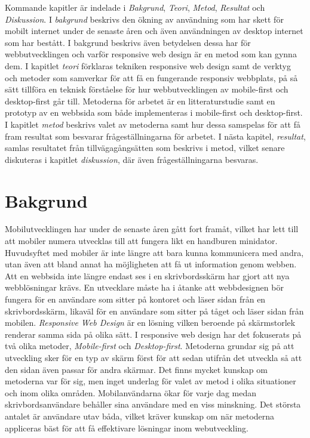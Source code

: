 \documentclass[11pt]{article}
\begin{document}
Kommande kapitler är indelade i \textit{Bakgrund}, \textit{Teori}, \textit{Metod}, \textit{Resultat} och \textit{Diskussion}. I \textit{bakgrund} beskrivs den ökning av användning som har skett för mobilt internet under de senaste åren och även användningen av desktop internet som har bestått. I bakgrund beskrivs även betydelsen dessa har för webbutvecklingen och varför responsive web design är en metod som kan gynna dem. I kapitlet \textit{teori} förklaras tekniken responsive web design samt de verktyg och metoder som samverkar för att få en fungerande responsiv webbplats, på så sätt tillföra en teknisk förståelse för hur webbutvecklingen av mobile-first och desktop-first går till. Metoderna för arbetet är en litteraturstudie samt en prototyp av en webbsida som både implementeras i mobile-first och desktop-first. I kapitlet \textit{metod} beskrivs valet av metoderna samt hur dessa samspelas för att få fram resultat som besvarar frågeställningarna för arbetet. I nästa kapitel, \textit{resultat}, samlas resultatet från tillvägagångsätten som beskrivs i metod, vilket senare diskuteras i kapitlet \textit{diskussion}, där även frågeställningarna besvaras. 



\newpage


\section{Bakgrund}

Mobilutvecklingen har under de senaste åren gått fort framåt, vilket har lett till att mobiler numera utvecklas till att fungera likt en handburen minidator. Huvudsyftet med mobiler är inte längre att bara kunna kommunicera med andra, utan även att bland annat ha möjligheten att få ut information genom webben. Att en webbsida inte längre endast ses i en skrivbordsskärm har gjort att nya webblösningar krävs. En utvecklare måste ha i åtanke att webbdesignen bör fungera för en användare som sitter på kontoret och läser sidan från en skrivbordsskärm, likaväl för en användare som sitter på tåget och läser sidan från mobilen. \textit{Responsive Web Design} är en lösning vilken beroende på skärmstorlek renderar samma sida på olika sätt. I responsive web design har det fokuserats på två olika metoder, \textit{Mobile-first} och \textit{Desktop-first}. Metoderna grundar sig på att utveckling sker för en typ av skärm först för att sedan utifrån det utveckla så att den sidan även passar för andra skärmar. Det finns mycket kunskap om metoderna var för sig, men inget underlag för valet av metod i olika situationer och inom olika områden. Mobilanvändarna ökar för varje dag medan skrivbordsanvändare behåller sina användare med en viss minskning. Det största antalet är användare utav båda, vilket kräver kunskap om när metoderna appliceras bäst för att få effektivare lösningar inom webutveckling.
\end{document}
